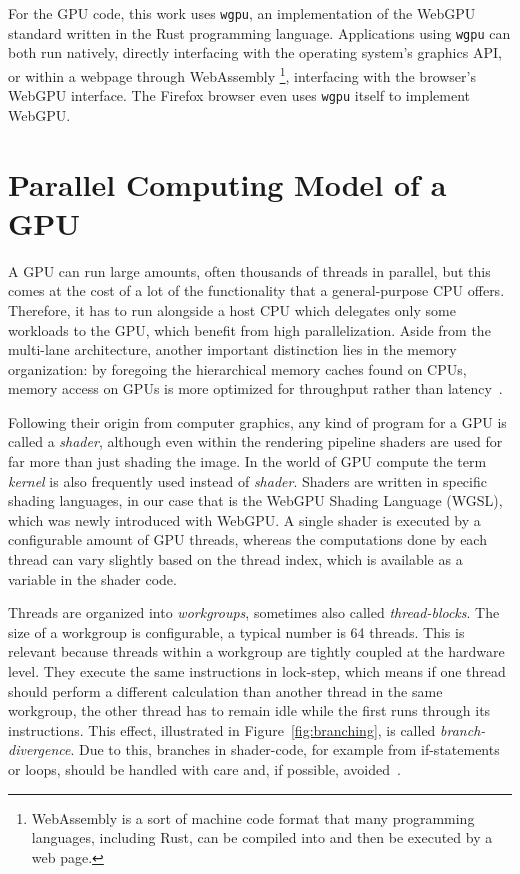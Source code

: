 For the GPU code, this work uses \texttt{wgpu}, an implementation of the WebGPU
standard written in the Rust programming language.
Applications using \texttt{wgpu} can both run natively, directly interfacing with the
operating system's graphics API,
or within a webpage through WebAssembly%
\footnote{WebAssembly is a sort of machine code format that many programming
languages, including Rust, can be compiled into
and then be executed by a web page.},
interfacing with the browser's WebGPU interface.
The Firefox browser even uses \texttt{wgpu} itself to implement WebGPU\@.


\section{Parallel Computing Model of a GPU}\label{sec:gpu_model}

A GPU can run large amounts, often thousands of threads in parallel,
but this comes at the cost of a lot of the functionality
that a general-purpose CPU offers.
Therefore, it has to run alongside a host CPU which delegates only some
workloads to the GPU, which benefit from high parallelization.
Aside from the multi-lane architecture, another important distinction lies in
the memory organization:
by foregoing the hierarchical memory caches found on CPUs,
memory access on GPUs is more optimized for throughput rather than
latency~\cite{Patterson2016}.

Following their origin from computer graphics, any kind of program for a GPU is
called a \emph{shader}, although even within the rendering pipeline
shaders are used for far more than just shading the image.
In the world of GPU compute the term \emph{kernel} is also frequently used
instead of \emph{shader}.
Shaders are written in specific shading languages,
in our case that is the WebGPU Shading Language (WGSL),
which was newly introduced with WebGPU\@.
A single shader is executed by a configurable amount of GPU threads,
whereas the computations done by each thread can vary slightly
based on the thread index,
which is available as a variable in the shader code.

Threads are organized into \emph{workgroups},
sometimes also called \emph{thread-blocks}.
The size of a workgroup is configurable,
a typical number is 64 threads.
This is relevant
because threads within a workgroup are tightly coupled at the hardware level.
They execute the same instructions in lock-step,
which means if one thread should perform a different calculation than another
thread in the same workgroup,
the other thread has to remain idle while the first runs through its
instructions.
This effect, illustrated in Figure~\ref{fig:branching}, is called
\emph{branch-divergence}.
Due to this, branches in shader-code,
for example from if-statements or loops,
should be handled with care and, if possible, avoided~\cite{Hijma2023}.

